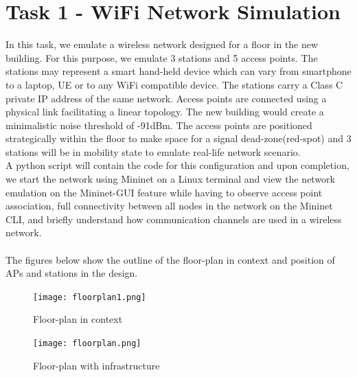 \documentclass{article}
\begin{document}
\section{Task 1 - WiFi Network Simulation}
In this task, we emulate a wireless network designed for a floor in the new building. For this purpose, we emulate 3 stations and 5 access points. The stations may represent a smart hand-held device which can vary from smartphone to a laptop, UE or to any WiFi compatible device. The stations carry a Class C private IP address of the same network. Access points are connected using a physical link facilitating a linear topology. The new building would create a minimalistic noise threshold of -91dBm. The access points are positioned strategically within the floor to make space for a signal dead-zone(red-spot) and 3 stations will be in mobility state to emulate real-life network scenario. \\ A python script will contain the code for this configuration and upon completion, we start the network using Mininet on a Linux terminal and view the network emulation on the Mininet-GUI feature while having to observe access point association, full connectivity between all nodes in the network on the Mininet CLI, and briefly understand how communication channels are used in a wireless network. \\\\
The figures below show the outline of the floor-plan in context and position of APs and  stations in the design.
    	\begin{figure}[h]
		\centering
        		\texttt{[image: floorplan1.png]}
        		\caption{Floor-plan in context}
        		\label{fig:t1-1}
        		\endminipage
        		\texttt{[image: floorplan.png]}
        		\caption{Floor-plan with infrastructure}
       		\label{fig:t1-2}
       		\endminipage
    	\end{figure} 
\end{document}
